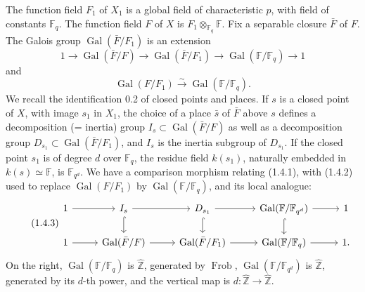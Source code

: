 \documentclass[10pt]{article}
\newcommand{\Fq}{\mathbb F_q}
\newcommand{\Fb}{\mathbb F}
\newcommand{\Zhat}{\widehat{\mathbb Z}}
\newcommand{\Gal}{\operatorname{Gal}}
\newcommand{\Frob}{\operatorname{Frob}}
\theoremstyle{deligne}
\begin{document}
The function field $F_1$ of $X_1$ is a global field of characteristic $p$, with field of constants $\Fq$. The function field $F$ of $X$ is $F_1\otimes_{\Fq}\Fb$. Fix a separable closure $\bar F$ of $F$. The Galois group $\Gal(\bar F/F_1)$ is an extension
\begin{equation}\tag{1.4.1}
1\longrightarrow \Gal(\bar F/F)\longrightarrow \Gal(\bar F/F_1)
\longrightarrow \Gal(\Fb/\Fq)\longrightarrow 1
\end{equation}
and
\begin{equation}\tag{1.4.2}
\Gal(F/F_1)\overset{\sim}{\longrightarrow}\Gal(\Fb/\Fq).
\end{equation}
We recall the identification 0.2 of closed points and places. If $s$ is a closed point of $X$, with image $s_1$ in $X_1$, the choice of a place $\bar s$ of $\bar F$ above $s$ defines a decomposition (= inertia) group $I_s\subset\Gal(\bar F/F)$ as well as a decomposition group $D_{s_1}\subset\Gal(\bar F/F_1)$, and $I_s$ is the inertia subgroup of $D_{s_1}$. If the closed point $s_1$ is of degree $d$ over $\Fq$, the residue field $k(s_1)$, naturally embedded in $k(s)\simeq\Fb$, is $\mathbb F_{q^d}$. We have a comparison morphism relating (1.4.1), with (1.4.2) used to replace $\Gal(F/F_1)$ by $\Gal(\Fb/\Fq)$, and its local analogue:
\begin{equation}\tag{1.4.3}
\begin{tikzcd}[column sep=2.6em,row sep=1.5em]
1 \arrow[r] & I_s \arrow[r] \arrow[d,hook] & D_{s_1} \arrow[r] \arrow[d,hook] & \Gal(\Fb/\mathbb F_{q^d}) \arrow[r] \arrow[d,hook] & 1\\
1 \arrow[r] & \Gal(\bar F/F) \arrow[r] & \Gal(\bar F/F_1) \arrow[r] & \Gal(\Fb/\Fq) \arrow[r] & 1 .
\end{tikzcd}
\end{equation}
On the right, $\Gal(\Fb/\Fq)$ is $\Zhat$, generated by $\Frob$, $\Gal(\Fb/\mathbb F_{q^d})$ is $\Zhat$, generated by its $d$-th power, and the vertical map is $d:\Zhat\to\Zhat$.
\end{document}
